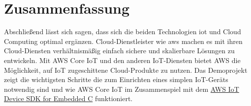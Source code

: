 \chapter{Zusammenfassung}\label{ch:6}
Abschließend lässt sich sagen, dass sich die beiden Technologien \acrshort{iot} und \Gls{Cloud Computing} optimal ergänzen. \Gls{Cloud}-Dienstleister wie \acrshort{aws} machen es mit ihren Cloud-Diensten verhältnismäßig einfach sichere und skalierbare Lösungen zu entwickeln. Mit AWS Core IoT und den anderen IoT-Diensten bietet AWS die Möglichkeit, auf IoT zugeschittene Cloud-Produkte zu nutzen. Das Demoprojekt zeigt die wichtigsten Schritte die zum Einrichten eines simplen IoT-Geräts notwendig sind und wie AWS Core IoT im Zusammenspiel mit dem \href{https://github.com/aws/aws-iot-device-sdk-embedded-C}{AWS IoT Device SDK for Embedded C} funktioniert.